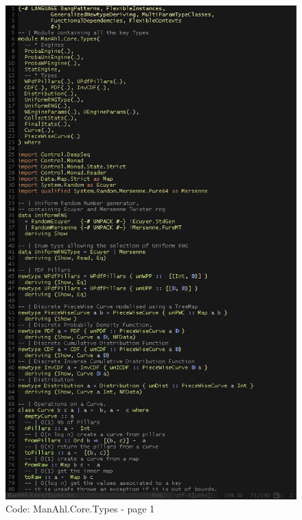 \documentclass[12pt,a4paper,article]{memoir} %
\begin{document}
\begin{figure}[h!]
\centering
\includegraphics[width=1\textwidth]{img/code-types-1.png}
\caption{Code: ManAhl.Core.Types - page 1}
\label{fig:core.types1}
\end{figure}
\end{document}
